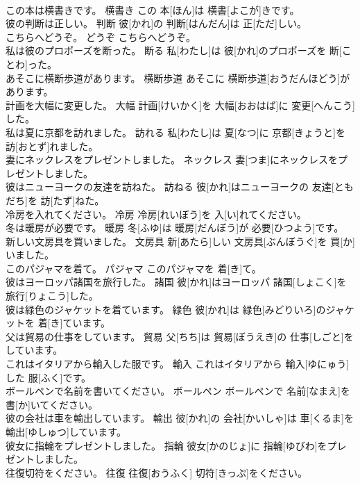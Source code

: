 \documentclass[8pt]{extreport}
\begin{document}
\begin{CJK}{UTF8}{min}
\\	この本は横書きです。	横書き	この 本[ほん]は 横書[よこが]きです。	
\\	彼の判断は正しい。	判断	彼[かれ]の 判断[はんだん]は 正[ただ]しい。	
\\	こちらへどうぞ。	どうぞ	こちらへどうぞ。	
\\	私は彼のプロポーズを断った。	断る	私[わたし]は 彼[かれ]のプロポーズを 断[ことわ]った。	
\\	あそこに横断歩道があります。	横断歩道	あそこに 横断歩道[おうだんほどう]があります。	
\\	計画を大幅に変更した。	大幅	計画[けいかく]を 大幅[おおはば]に 変更[へんこう]した。	
\\	私は夏に京都を訪れました。	訪れる	私[わたし]は 夏[なつ]に 京都[きょうと]を 訪[おとず]れました。	
\\	妻にネックレスをプレゼントしました。	ネックレス	妻[つま]にネックレスをプレゼントしました。	
\\	彼はニューヨークの友達を訪ねた。	訪ねる	彼[かれ]はニューヨークの 友達[ともだち]を 訪[たず]ねた。	
\\	冷房を入れてください。	冷房	冷房[れいぼう]を 入[い]れてください。	
\\	冬は暖房が必要です。	暖房	冬[ふゆ]は 暖房[だんぼう]が 必要[ひつよう]です。	
\\	新しい文房具を買いました。	文房具	新[あたら]しい 文房具[ぶんぼうぐ]を 買[か]いました。	
\\	このパジャマを着て。	パジャマ	このパジャマを 着[き]て。	
\\	彼はヨーロッパ諸国を旅行した。	諸国	彼[かれ]はヨーロッパ 諸国[しょこく]を 旅行[りょこう]した。	
\\	彼は緑色のジャケットを着ています。	緑色	彼[かれ]は 緑色[みどりいろ]のジャケットを 着[き]ています。	
\\	父は貿易の仕事をしています。	貿易	父[ちち]は 貿易[ぼうえき]の 仕事[しごと]をしています。	
\\	これはイタリアから輸入した服です。	輸入	これはイタリアから 輸入[ゆにゅう]した 服[ふく]です。	
\\	ボールペンで名前を書いてください。	ボールペン	ボールペンで 名前[なまえ]を 書[か]いてください。	
\\	彼の会社は車を輸出しています。	輸出	彼[かれ]の 会社[かいしゃ]は 車[くるま]を 輸出[ゆしゅつ]しています。	
\\	彼女に指輪をプレゼントしました。	指輪	彼女[かのじょ]に 指輪[ゆびわ]をプレゼントしました。	
\\	往復切符をください。	往復	往復[おうふく] 切符[きっぷ]をください。	

\end{CJK}
\end{document}
